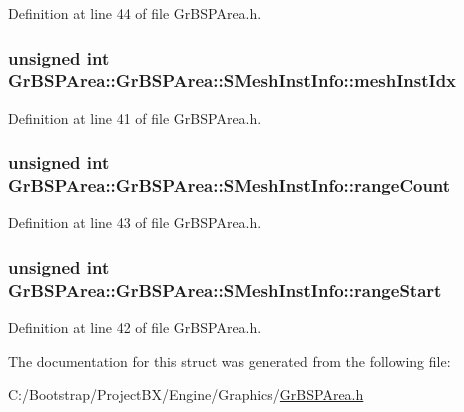 Definition at line 44 of file GrBSPArea.h.\hypertarget{struct_gr_b_s_p_area_1_1_s_mesh_inst_info_cbc04c50efb0f6be8b67797894d4a432}{
\subsubsection[{meshInstIdx}]{\setlength{\rightskip}{0pt plus 5cm}unsigned int GrBSPArea::GrBSPArea::SMeshInstInfo::meshInstIdx}}
\label{struct_gr_b_s_p_area_1_1_s_mesh_inst_info_cbc04c50efb0f6be8b67797894d4a432}




Definition at line 41 of file GrBSPArea.h.\hypertarget{struct_gr_b_s_p_area_1_1_s_mesh_inst_info_862a02786df63d5fb626d51ab88a769c}{
\subsubsection[{rangeCount}]{\setlength{\rightskip}{0pt plus 5cm}unsigned int GrBSPArea::GrBSPArea::SMeshInstInfo::rangeCount}}
\label{struct_gr_b_s_p_area_1_1_s_mesh_inst_info_862a02786df63d5fb626d51ab88a769c}




Definition at line 43 of file GrBSPArea.h.\hypertarget{struct_gr_b_s_p_area_1_1_s_mesh_inst_info_89f8bfcc8ffdf02fb93f230a1c73e1b9}{
\subsubsection[{rangeStart}]{\setlength{\rightskip}{0pt plus 5cm}unsigned int GrBSPArea::GrBSPArea::SMeshInstInfo::rangeStart}}
\label{struct_gr_b_s_p_area_1_1_s_mesh_inst_info_89f8bfcc8ffdf02fb93f230a1c73e1b9}




Definition at line 42 of file GrBSPArea.h.

The documentation for this struct was generated from the following file:\begin{CompactItemize}
\item 
C:/Bootstrap/ProjectBX/Engine/Graphics/\hyperlink{_gr_b_s_p_area_8h}{GrBSPArea.h}\end{CompactItemize}
